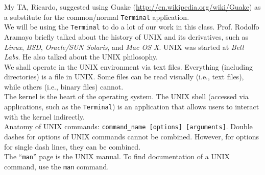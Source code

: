 My TA, Ricardo, suggested using Guake (\url{http://en.wikipedia.org/wiki/Guake}) as a substitute for the common/normal {\tt Terminal} application. \\

We will be using the {\tt Terminal} to do a lot of our work in this class. Prof. Rodolfo Aramayo briefly talked about the history of UNIX and its derivatives, such as {\it Linux}, {\it BSD}, {\it Oracle/SUN Solaris}, and {\it Mac OS X}. UNIX was started at {\it Bell Labs}. He also talked about the UNIX philosophy. \\

We shall operate in the UNIX environment via text files. Everything (including directories) is a file in UNIX. Some files can be read visually (i.e., text files), while others (i.e., binary files) cannot. \\




The kernel is the heart of the operating system. The UNIX shell (accessed via applications, such as the {\tt Terminal}) is an application that allows users to interact with the kernel indirectly. \\





Anatomy of UNIX commands: {\tt command\_name [options] [arguments]}. Double dashes for options of UNIX commands cannot be combined. However, for options for single dash lines, they can be combined. \\

The ``{\tt man}'' page is the UNIX manual. To find documentation of a UNIX command, use the {\tt man} command. \\




